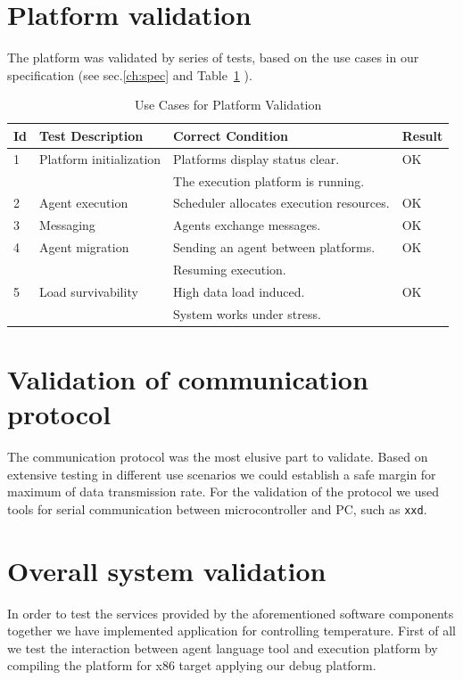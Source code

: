 \documentclass{scrreprt}
\begin{document}
\section{Platform validation}
The platform was validated by series of tests, based on the use cases
in our specification (see sec.\ref{ch:spec} and Table~\ref{tab:validacases} ). 

\vspace{0.2in}
\begin{table}[!htbp]
\begin{tabular}{|l|l|l|l|} \hline
  \textbf{Id} & \textbf{Test Description} & \textbf{Correct Condition} & \textbf{Result} \\\hline
  1 & Platform initialization & Platforms display status clear. & OK \\
    & & The execution platform is running. & \\ \hline 
  2 & Agent execution & Scheduler allocates execution resources. & OK \\ \hline
  3 & Messaging & Agents exchange messages. & OK \\ \hline
  4 & Agent migration & Sending an agent between platforms. & OK \\ 
  & &  Resuming execution. & \\ \hline
  5 & Load survivability  & High data load induced. & OK \\
    & & System works under stress. & \\ 
  \hline
\end{tabular}
\label{tab:validacases}
\caption{Use Cases for Platform Validation }
\end{table}

\section{Validation of communication protocol}
The communication protocol was the most elusive part to validate.
Based on extensive testing in different use scenarios we could establish
a safe margin for maximum of data transmission rate.
For the validation of the protocol we used tools for serial communication
between microcontroller and PC, such as \texttt{xxd}.

\section{Overall system validation}
In order to test the services provided by the aforementioned software components
together we have implemented application for controlling temperature.
First of all we test the interaction between agent language tool and execution platform
by compiling the platform for x86 target applying our debug platform.
\end{document}
